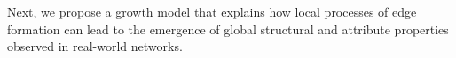 Next, we propose a growth model that explains how local processes of
edge formation can lead to the emergence of global structural and
attribute properties observed in real-world networks.





